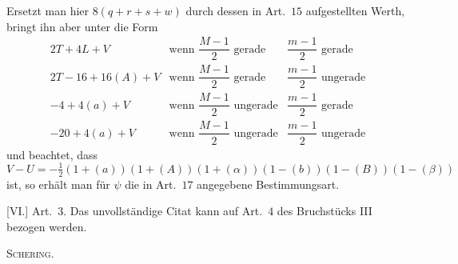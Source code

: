 Ersetzt man hier $8(q+r+s+w)$ durch dessen in Art.\ $15$ aufgestellten Werth, bringt ihn aber unter die Form
\[
\begin{array}{lll}
2T+4L+V&\text{wenn }\dfrac{M-1}{2}\text{ gerade}&\dfrac{m-1}{2}\text{ gerade}\\[4pt]
2T-16+16(A)+V&\text{wenn }\dfrac{M-1}{2}\text{ gerade}&\dfrac{m-1}{2}\text{ ungerade}\\[4pt]
-4+4(a)+V&\text{wenn }\dfrac{M-1}{2}\text{ ungerade}&\dfrac{m-1}{2}\text{ gerade}\\[4pt]
-20+4(a)+V&\text{wenn }\dfrac{M-1}{2}\text{ ungerade}&\dfrac{m-1}{2}\text{ ungerade}
\end{array}
\]
und beachtet, dass
\[
V-U=-\tfrac12(1+(a))(1+(A))(1+(\alpha))(1-(b))(1-(B))(1-(\beta))
\]
ist, so erhält man für $\psi$ die in Art.\ $17$ angegebene Bestimmungsart.

[VI.] Art.\ $3$. Das unvollständige Citat kann auf Art.\ $4$ des Bruchstücks III bezogen werden.
\begin{flushright}\textsc{Schering.}\end{flushright}

